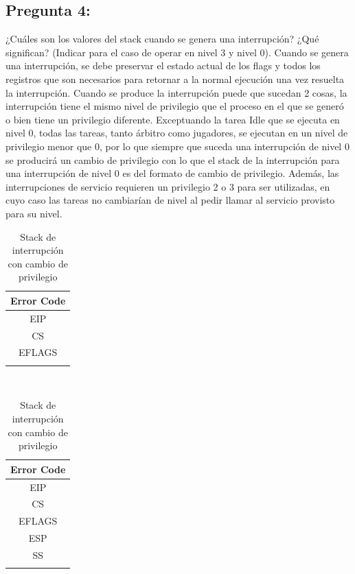\documentclass[10pt, a4paper]{article}
\begin{document}
{\subsection{Pregunta 4:}} ¿Cuáles son los valores del stack cuando se genera una interrupción? ¿Qué significan? (Indicar para el caso de operar en nivel 3 y nivel 0).\newline
Cuando se genera una interrupción, se debe preservar el estado actual de los flags y todos los registros que son necesarios para retornar a la normal ejecución una vez resuelta la interrupción.
Cuando se produce la interrupción puede que sucedan 2 cosas, la interrupción tiene el mismo nivel de privilegio que el proceso en el que se generó o bien tiene un privilegio diferente. Exceptuando la tarea Idle que se ejecuta en nivel 0, todas las tareas, tanto \'arbitro como jugadores, se ejecutan en un nivel de privilegio menor que 0, por lo que siempre que suceda una interrupción de nivel 0 se producirá un cambio de privilegio con lo que el stack de la interrupción para una interrupción de nivel 0 es del formato de cambio de privilegio. Además, las interrupciones de servicio requieren un privilegio 2 o 3 para ser utilizadas, en cuyo caso las tareas no cambiarían de nivel al pedir llamar al servicio provisto para su nivel.

\begin{table}[h]
	\begin{minipage}{0.7\textwidth}
		\hspace*{0.3\textwidth}
		\begin{tabular}{|c|}
			\\ \hline
			Error Code \\ \hline
			EIP \\ \hline
			CS \\ \hline
			EFLAGS \\ \hline
			\\
		\end{tabular}
		\caption{Stack de interrupción sin cambio de privilegio}
	\end{minipage}
	~
	\begin{minipage}{0.7\textwidth}
		\hspace*{0.3\textwidth}
		\begin{tabular}{|c|}
			\\ \hline
			Error Code \\ \hline
			EIP \\ \hline
			CS \\ \hline
			EFLAGS \\ \hline
			ESP \\ \hline
			SS \\ \hline
			\\
		\end{tabular}
		\caption{Stack de interrupción con cambio de privilegio}
	\end{minipage}
\end{table}
\end{document}
